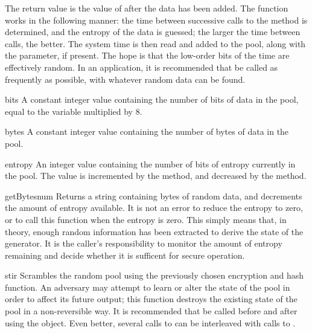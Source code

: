 \documentclass{howto}
\begin{document}
The return value is the value of  after the data has
been added.  The function works in the following manner: the time
between successive calls to the  method is determined,
and the entropy of the data is guessed; the larger the time between
calls, the better.  The system time is then read and added to the pool,
along with the  parameter, if present.  The hope is that the
low-order bits of the time are effectively random.  In an application,
it is recommended that  be called as frequently as
possible, with whatever random data can be found.

\begin{datadesc}{bits}
A constant integer value containing the number of bits of data in
the pool, equal to the  variable multiplied by 8.
\end{datadesc}

\begin{datadesc}{bytes}
A constant integer value containing the number of bytes of data in
the pool.
\end{datadesc}

\begin{datadesc}{entropy}
An integer value containing the number of bits of entropy currently in
the pool.  The value is incremented by the  method,
and decreased by the  method.
\end{datadesc}

\begin{funcdesc}{getBytes}{num}
Returns a string containing  bytes of random data, and
decrements the amount of entropy available.  It is not an error to
reduce the entropy to zero, or to call this function when the entropy
is zero.  This simply means that, in theory, enough random information has been
extracted to derive the state of the generator.  It is the caller's
responsibility to monitor the amount of entropy remaining and decide
whether it is sufficent for secure operation.
\end{funcdesc}

\begin{funcdesc}{stir}{}
Scrambles the random pool using the previously chosen encryption and
hash function.  An adversary may attempt to learn or alter the state
of the pool in order to affect its future output; this function
destroys the existing state of the pool in a non-reversible way.  It
is recommended that  be called before and after using
the  object.  Even better, several calls to
 can be interleaved with calls to .
\end{funcdesc}
\end{document}
